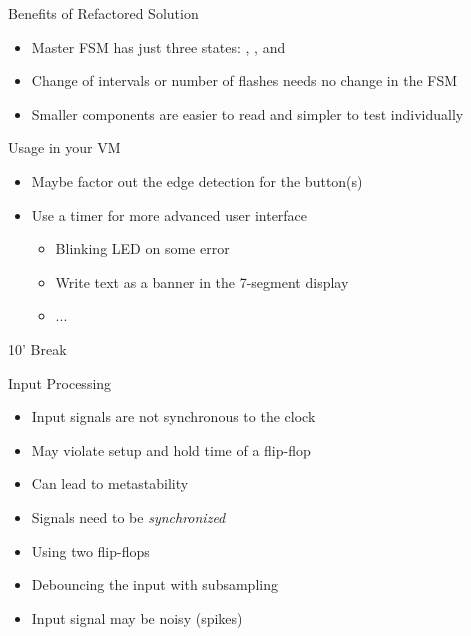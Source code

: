 
\begin{frame}[fragile]{Benefits of Refactored Solution}
\begin{itemize}
\item Master FSM has just three states: , , and 
\item Change of intervals or number of flashes needs no change in the FSM
\item Smaller components are easier to read and simpler to test individually
\end{itemize}
\end{frame}

\begin{frame}[fragile]{Usage in your VM}
\begin{itemize}
\item Maybe factor out the edge detection for the button(s)
\item Use a timer for more advanced user interface
\begin{itemize}
\item Blinking LED on some error
\item Write text as a banner in the 7-segment display
\item ...
\end{itemize}
\end{itemize}
\end{frame}


\begin{frame}[fragile]{10' Break}
\end{frame}

\begin{frame}[fragile]{Input Processing}
\begin{itemize}
\item Input signals are not synchronous to the clock
\item May violate setup and hold time of a flip-flop
\item Can lead to metastability
\item Signals need to be \emph{synchronized}
\item Using two flip-flops
\item Debouncing the input with subsampling
\item Input signal may be noisy (spikes)
\end{itemize}
\end{frame}

